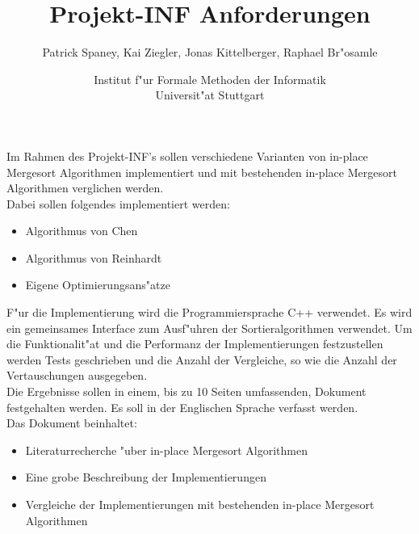 \documentclass[12pt,pdftex,a4paper]{article}
\begin{document}
\title{Projekt-INF Anforderungen}
\author{Patrick Spaney, Kai Ziegler, Jonas Kittelberger, Raphael Br"osamle}
\date{Institut f"ur Formale Methoden der Informatik \\ Universit"at Stuttgart}
\maketitle
\[\]
Im Rahmen des Projekt-INF's sollen verschiedene Varianten von in-place Mergesort Algorithmen implementiert und mit bestehenden in-place Mergesort Algorithmen verglichen werden. \\
Dabei sollen folgendes implementiert werden:
\begin{itemize}
\item Algorithmus von Chen
\item Algorithmus von Reinhardt
\item Eigene Optimierungsans"atze
\end{itemize}
F"ur die Implementierung wird die Programmiersprache C++ verwendet. Es wird ein gemeinsames Interface zum Ausf"uhren der Sortieralgorithmen verwendet. Um die Funktionalit"at und die Performanz der Implementierungen festzustellen werden Tests geschrieben und die Anzahl der Vergleiche, so wie die Anzahl der Vertauschungen ausgegeben.\\
Die Ergebnisse sollen in einem, bis zu 10 Seiten umfassenden, Dokument festgehalten werden. Es soll in der Englischen Sprache verfasst werden.  \\
Das Dokument beinhaltet: 
\begin{itemize}
\item Literaturrecherche "uber in-place Mergesort Algorithmen
\item Eine grobe Beschreibung der Implementierungen
\item Vergleiche der Implementierungen mit bestehenden in-place Mergesort Algorithmen
\end{itemize}

\end{document}
